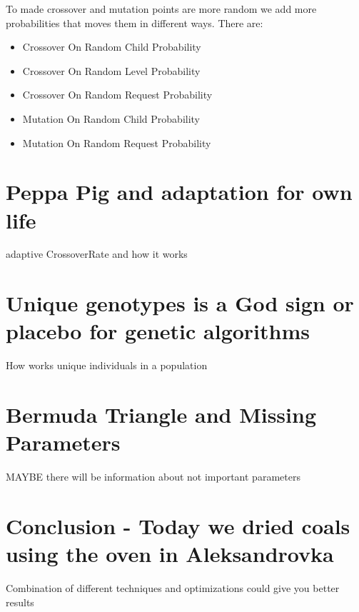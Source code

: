 To made crossover and mutation points are more random we add more probabilities that moves them in different ways.
There are:
\begin{itemize}
	\item Crossover On Random Child Probability
	\item Crossover On Random Level Probability
	\item Crossover On Random Request Probability
	\item Mutation On Random Child Probability
	\item Mutation On Random Request Probability
\end{itemize}


\section{Peppa Pig and adaptation for own life}
adaptive CrossoverRate and how it works


\section{Unique genotypes is a God sign or placebo for genetic algorithms}
How works unique individuals in a population

\section{Bermuda Triangle and Missing Parameters}
MAYBE there will be information about not important parameters

\section*{Conclusion - Today we dried coals using the oven in Aleksandrovka}
Combination of different techniques and optimizations could give you better results 